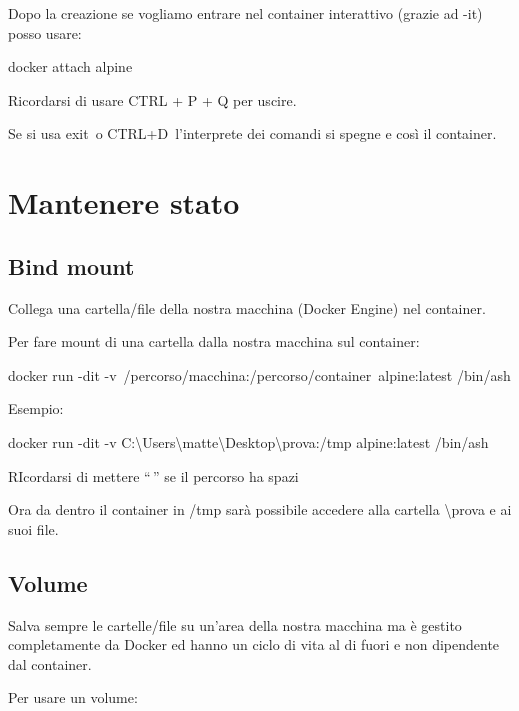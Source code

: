\documentclass[
]{article}
\begin{document}
{Dopo la creazione se vogliamo }{entrare }{nel container interattivo
(grazie ad }{-it}{) posso usare:}

{}

{docker attach alpine}

{Ricordarsi di usare }{CTRL + P + Q per uscire}{.}

{Se si usa }{exit}{~o }{CTRL+D}{~l'interprete dei comandi si spegne e
così il container.}

\section{\texorpdfstring{{Mantenere
stato}}{Mantenere stato}}\label{h.ho19oaw5gtik}

\subsection{\texorpdfstring{{Bind
mount}}{Bind mount}}\label{h.te5p8a1bf5ws}

{Collega una cartella/file della nostra macchina (Docker Engine) nel
container.}

{Per fare mount di una cartella dalla nostra macchina sul container:}

{}

{docker run -dit
-v}{~/percorso/macchina:/percorso/container}{~alpine:latest /bin/ash}

{}

{Esempio:}

{docker run -dit -v
C:\textbackslash Users\textbackslash matte\textbackslash Desktop\textbackslash prova:/tmp
alpine:latest /bin/ash}

{RIcordarsi di mettere ``\,'' se il percorso ha spazi}

{}

{Ora da dentro il container in /tmp sarà possibile accedere alla
cartella \textbackslash prova e ai suoi file.}

\subsection{\texorpdfstring{{Volume}}{Volume}}\label{h.4cbnup7dn8k}

{Salva sempre le cartelle/file su un'area della nostra macchina ma è
gestito completamente da Docker ed hanno un ciclo di vita al di fuori e
non dipendente dal container.}

{}

{Per }{usare }{un volume:}
\end{document}
